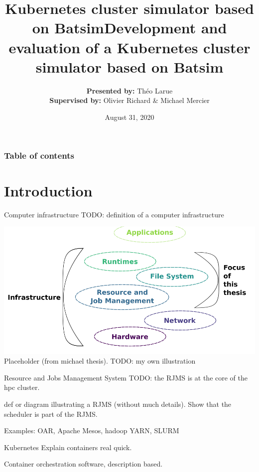 \documentclass[12pt, aspectratio=43]{beamer}
\title{Kubernetes cluster simulator based on Batsim}
\title{Development and evaluation of a Kubernetes cluster simulator based on
Batsim}
\author{\textbf{Presented by:} Théo Larue\\\textbf{Supervised by:} Olivier
Richard \& Michael Mercier}
\date{August 31, 2020}
\institute[Théo LARUE]{Université Grenoble Alpes}
\begin{document}
\frame{\titlepage}

\begin{frame}\frametitle{Table of contents}\tableofcontents
\end{frame}

\section{Introduction}

\begin{frame}{Computer infrastructure}
	TODO: definition of a computer infrastructure

	\includegraphics[scale=0.3]{../imgs/comp-infra-michael.png}
	\small{Placeholder (from michael thesis). TODO: my own illustration}
\end{frame}

\begin{frame}{Resource and Jobs Management System}
	TODO: the RJMS is at the core of the hpc cluster.

	def or diagram illustrating a RJMS (without much details). Show that the
	scheduler is part of the RJMS.

	Examples: OAR, Apache Mesos, hadoop YARN, SLURM
\end{frame}

\begin{frame}{Kubernetes}
	Explain containers real quick.

	Container orchestration software, description based.
\end{frame}
\end{document}
